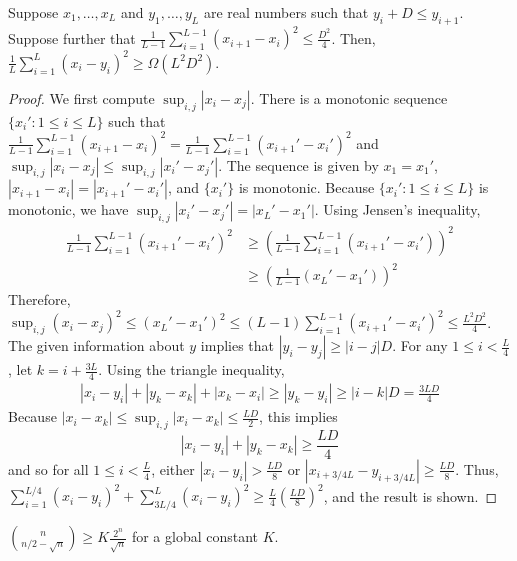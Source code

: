 \begin{lemma}\label{chap1-lem:tradeoff-inequality}
Suppose $x_1,\ldots, x_L$ and $y_1,\ldots, y_L$ are real numbers such that $y_{i} + D \leq y_{i+1}$. Suppose further that $\frac{1}{L-1}\sum_{i=1}^{L-1} (x_{i+1} - x_i)^2 \leq \frac{D^2}{4}$. Then, 
$\frac{1}{L} \sum_{i=1}^L (x_i-y_i)^2 \geq \Omega(L^2D^2)$.
\end{lemma}
\begin{proof}
We first compute $\sup_{i,j} |x_i - x_j|$. There is a monotonic sequence $\{x_i'
: 1\leq i \leq L\}$ such that $\frac{1}{L-1}\sum_{i=1}^{L-1} (x_{i+1}-x_i)^2 =
\frac{1}{L-1} \sum_{i=1}^{L-1} (x_{i+1}' - x_{i}')^2$ and $\sup_{i,j}|x_i - x_j|
\leq \sup_{i,j}|x_i' - x_j'|$. The sequence is given 
by $x_1 = x_1'$, $|x_{i+1}-x_i| = |x_{i+1}'-x_i'|$, and $\{x_i'\}$ is monotonic. 
Because
$\{x_i' : 1 \leq i \leq L \}$ is monotonic, we have $\sup_{i,j}|x_i'-x_j'| = |x_L' - x_1'|$.
Using Jensen's inequality,
\begin{align*}
    \frac{1}{L-1}\sum_{i=1}^{L-1} (x_{i+1}'-x_i')^2 &\geq \left( \frac{1}{L-1}
    \sum_{i=1}^{L-1} (x_{i+1}' - x_i') \right)^2 \\
    &\geq \left( \frac{1}{L-1} (x_L' - x_1')\right)^2
\end{align*}
Therefore, $\sup_{i,j}(x_i - x_j)^2 \leq (x_L' - x_1')^2 \leq (L-1)
\sum_{i=1}^{L-1} (x_{i+1}' - x_i')^2 \leq \frac{L^2D^2}{4}$. The given
information about $y$ implies that $|y_i - y_j| \geq |i-j|D$.
For any $1 \leq i < \frac{L}{4}$, let $k = i + \frac{3L}{4}$. Using the triangle inequality,
\begin{align*}
    |x_i - y_i| + |y_k - x_k| + |x_k - x_i| \geq 
    |y_k - y_i|
    \geq 
    |i-k|D
    = \frac{3LD}{4}
\end{align*}
Because $|x_i - x_k| \leq \sup_{i,j} |x_i-x_k| \leq \frac{LD}{2}$, this implies
\[
|x_i - y_i| + |y_k - x_k| \geq \frac{LD}{4}
\]
and so for all $1 \leq i < \frac{L}{4}$, either $|x_i - y_i| > \frac{LD}{8}$ or $|x_{i+3/4L} - y_{i+3/4L}| \geq \frac{LD}{8}$. 
Thus, $\sum_{i=1}^{L/4} (x_i - y_i)^2 + \sum_{3L/4}^L (x_i - y_i)^2 \geq \frac{L}{4} (\frac{LD}{8})^2$, and the result is shown.
\end{proof}
\begin{lemma}\label{chap1-lem:binom}
  $\binom{n}{n/2-\sqrt{n}} \geq K \frac{2^n}{\sqrt{n}}$ for a global constant $K$.
\end{lemma}
